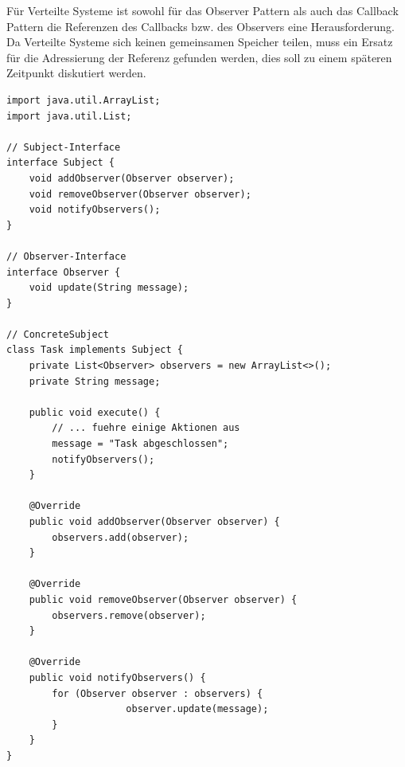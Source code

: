\documentclass[../vs-script-first-v01.tex]{subfiles}
\begin{document}
Für Verteilte Systeme ist sowohl für das Observer Pattern als auch das Callback Pattern die Referenzen des Callbacks bzw. des Observers eine Herausforderung. Da Verteilte Systeme sich keinen gemeinsamen Speicher teilen, muss ein Ersatz für die Adressierung der Referenz gefunden werden, dies soll zu einem späteren Zeitpunkt diskutiert werden. \\

\begin{minipage}{\textwidth}
\begin{lstlisting}[caption={Observer Pattern - ConcreteSubject},captionpos=b,label={lst:observer-I}]
import java.util.ArrayList;
import java.util.List;

// Subject-Interface
interface Subject {
    void addObserver(Observer observer);
    void removeObserver(Observer observer);
    void notifyObservers();
}

// Observer-Interface
interface Observer {
    void update(String message);
}

// ConcreteSubject
class Task implements Subject {
    private List<Observer> observers = new ArrayList<>();
    private String message;

    public void execute() {
        // ... fuehre einige Aktionen aus
        message = "Task abgeschlossen";
        notifyObservers();
    }

    @Override
    public void addObserver(Observer observer) {
        observers.add(observer);
    }

    @Override
    public void removeObserver(Observer observer) {
        observers.remove(observer);
    }

    @Override
    public void notifyObservers() {
        for (Observer observer : observers) {
                     observer.update(message);
        }
    }
}


\end{lstlisting}
\end{minipage}
\end{document}
